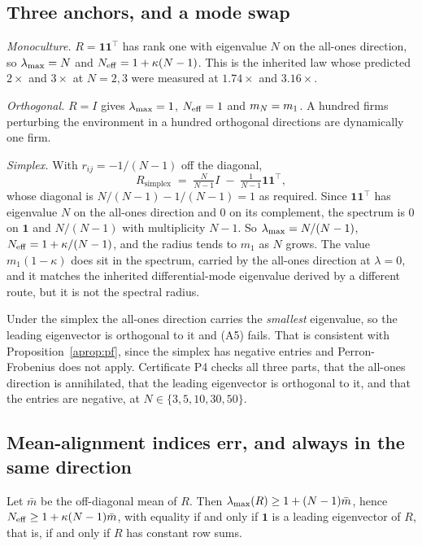 \subsection{Three anchors, and a mode swap}

\emph{Monoculture.} $R=\mathbf{1}\mathbf{1}^{\top}$ has rank one with eigenvalue $N$ on the all-ones direction, so $\lambda_{\max}=N$ and $N_{\mathrm{eff}} = 1+\kappa(N-1)$. This is the inherited law whose predicted $2\times$ and $3\times$ at $N=2,3$ were measured at $1.74\times$ and $3.16\times$.

\emph{Orthogonal.} $R=I$ gives $\lambda_{\max}=1$, $N_{\mathrm{eff}}=1$ and $m_N = m_1$. A hundred firms perturbing the environment in a hundred orthogonal directions are dynamically one firm.

\emph{Simplex.} With $r_{ij} = -1/(N-1)$ off the diagonal,
\[
  R_{\text{simplex}} \;=\; \tfrac{N}{N-1}I \;-\; \tfrac{1}{N-1}\mathbf{1}\mathbf{1}^{\top},
\]
whose diagonal is $N/(N-1) - 1/(N-1) = 1$ as required. Since $\mathbf{1}\mathbf{1}^{\top}$ has eigenvalue $N$ on the all-ones direction and $0$ on its complement, the spectrum is $0$ on $\mathbf{1}$ and $N/(N-1)$ with multiplicity $N-1$. So $\lambda_{\max} = N/(N-1)$, $N_{\mathrm{eff}} = 1 + \kappa/(N-1)$, and the radius tends to $m_1$ as $N$ grows. The value $m_1(1-\kappa)$ does sit in the spectrum, carried by the all-ones direction at $\lambda=0$, and it matches the inherited differential-mode eigenvalue derived by a different route, but it is not the spectral radius.

Under the simplex the all-ones direction carries the \emph{smallest} eigenvalue, so the leading eigenvector is orthogonal to it and (A5) fails. That is consistent with Proposition~\ref{aprop:pf}, since the simplex has negative entries and Perron-Frobenius does not apply. Certificate P4 checks all three parts, that the all-ones direction is annihilated, that the leading eigenvector is orthogonal to it, and that the entries are negative, at $N \in \{3,5,10,30,50\}$.

\subsection{Mean-alignment indices err, and always in the same direction}

\begin{aproposition}
\label{aprop:mean}
Let $\bar{m}$ be the off-diagonal mean of $R$. Then $\lambda_{\max}(R) \geq 1 + (N-1)\bar{m}$, hence $N_{\mathrm{eff}} \geq 1 + \kappa(N-1)\bar{m}$, with equality if and only if $\mathbf{1}$ is a leading eigenvector of $R$, that is, if and only if $R$ has constant row sums.
\end{aproposition}

